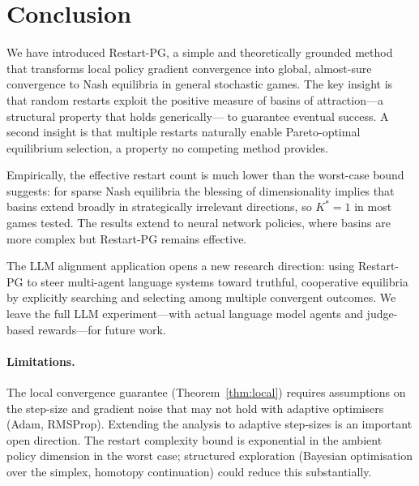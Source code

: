 \documentclass{article}
\begin{document}
\section{Conclusion}
\label{sec:conclusion}

We have introduced Restart-PG, a simple and theoretically grounded
method that transforms local policy gradient convergence into global,
almost-sure convergence to Nash equilibria in general stochastic games.
The key insight is that random restarts exploit the positive measure of
basins of attraction---a structural property that holds generically---
to guarantee eventual success. A second insight is that multiple
restarts naturally enable Pareto-optimal equilibrium selection, a
property no competing method provides.

Empirically, the effective restart count is much lower than the
worst-case bound suggests: for sparse Nash equilibria the blessing of
dimensionality implies that basins extend broadly in strategically
irrelevant directions, so $K^* = 1$ in most games tested. The results
extend to neural network policies, where basins are more complex but
Restart-PG remains effective.

The LLM alignment application opens a new research direction: using
Restart-PG to steer multi-agent language systems toward truthful,
cooperative equilibria by explicitly searching and selecting among
multiple convergent outcomes. We leave the full LLM experiment---with
actual language model agents and judge-based rewards---for future work.

\paragraph{Limitations.}
The local convergence guarantee (Theorem~\ref{thm:local}) requires
assumptions on the step-size and gradient noise that may not hold with
adaptive optimisers (Adam, RMSProp). Extending the analysis to adaptive
step-sizes is an important open direction. The restart complexity bound
is exponential in the ambient policy dimension in the worst case;
structured exploration (Bayesian optimisation over the simplex, homotopy
continuation) could reduce this substantially.



\end{document}
